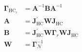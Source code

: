 \begin{equation}
	\begin{split}
	\boldsymbol{\Gamma}_{
		\mathrm{HC}_{r}
	}
	&
	=
	\boldsymbol{A}^{-1}
	\boldsymbol{B}
	\boldsymbol{A}^{-1}
	\\
	\boldsymbol{A}
	&
	=
	\boldsymbol{J}_{\mathrm{HC}}^{\prime}
	\boldsymbol{W}
	\boldsymbol{J}_{\mathrm{HC}}
	\\
	\boldsymbol{B}
	&
	=
	\boldsymbol{J}_{\mathrm{HC}}^{\prime}
	\boldsymbol{W}
	\boldsymbol{\Gamma}_{r}
	\boldsymbol{W}
	\boldsymbol{J}_{\mathrm{HC}}
	\\
	\boldsymbol{W}
	&
	=
	\boldsymbol{\Gamma}_{\mathcal{N}}^{-1}
	\end{split}
\end{equation}
